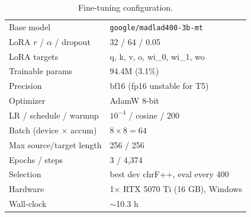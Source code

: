 \documentclass[10pt,twocolumn]{article}
\begin{document}
\begin{table}[h]
\centering\footnotesize
\begin{tabular}{ll}
\toprule
Base model & \texttt{google/madlad400-3b-mt} \\
LoRA $r$ / $\alpha$ / dropout & 32 / 64 / 0.05 \\
LoRA targets & q, k, v, o, wi\_0, wi\_1, wo \\
Trainable params & 94.4M (3.1\%) \\
Precision & bf16 (fp16 unstable for T5) \\
Optimizer & AdamW 8-bit \\
LR / schedule / warmup & $10^{-4}$ / cosine / 200 \\
Batch (device $\times$ accum) & $8 \times 8 = 64$ \\
Max source/target length & 256 / 256 \\
Epochs / steps & 3 / 4{,}374 \\
Selection & best dev chrF++, eval every 400 \\
Hardware & 1$\times$ RTX 5070 Ti (16 GB), Windows \\
Wall-clock & $\sim$10.3 h \\
\bottomrule
\end{tabular}
\caption{Fine-tuning configuration.}
\end{table}
\end{document}
